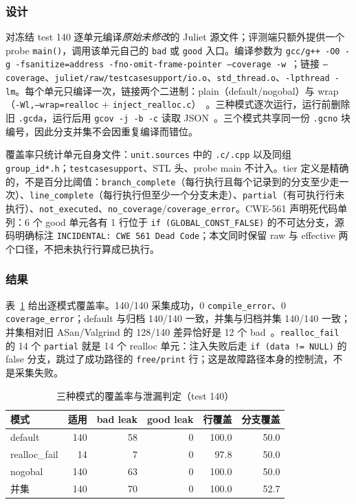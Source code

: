 \documentclass[conference]{IEEEtran}
\begin{document}
\subsubsection{设计}

对冻结 test 140 逐单元编译\emph{原始未修改}的 Juliet 源文件；评测端只额外提供一个 probe \texttt{main()}，调用该单元自己的 \texttt{bad} 或 \texttt{good} 入口。编译参数为 \texttt{gcc/g++ -O0 -g -fsanitize=address -fno-omit-frame-pointer --coverage -w}~\cite{serebryany2012asan}；链接 \texttt{--coverage}、\texttt{juliet/raw/testcasesupport/io.o}、\texttt{std\_thread.o}、\texttt{-lpthread -lm}。每个单元只编译一次，链接两个二进制：plain（default/nogobal）与 wrap（\texttt{-Wl,--wrap=realloc} + \texttt{inject\_realloc.c}）~\cite{cppreference_realloc}。三种模式逐次运行，运行前删除旧 \texttt{.gcda}，运行后用 \texttt{gcov -j -b -c} 读取 JSON~\cite{gcov}。三个模式共享同一份 \texttt{.gcno} 块编号，因此分支并集不会因重复编译而错位。

覆盖率只统计单元自身文件：\texttt{unit.sources} 中的 \texttt{.c/.cpp} 以及同组 \texttt{group\_id*.h}；\texttt{testcasesupport}、STL 头、probe main 不计入。tier 定义是精确的，不是百分比阈值：\texttt{branch\_complete}（每行执行且每个记录到的分支至少走一次）、\texttt{line\_complete}（每行执行但至少一个分支未走）、\texttt{partial}（有可执行行未执行）、\texttt{not\_executed}、\texttt{no\_coverage}/\texttt{coverage\_error}。CWE-561 声明死代码单列：6 个 good 单元各有 1 行位于 \texttt{if (GLOBAL\_CONST\_FALSE)} 的不可达分支，源码明确标注 \texttt{INCIDENTAL: CWE 561 Dead Code}；本文同时保留 raw 与 effective 两个口径，不把未执行行算成已执行。

\subsubsection{结果}

表~\ref{tab:covmode} 给出逐模式覆盖率。140/140 采集成功，0 \texttt{compile\_error}、0 \texttt{coverage\_error}；default 与归档 140/140 一致，并集与归档并集 140/140 一致；并集相对旧 ASan/Valgrind 的 128/140 差异恰好是 12 个 bad~\cite{valgrindmanual}。\texttt{realloc\_fail} 的 14 个 \texttt{partial} 就是 14 个 realloc 单元：注入失败后走 \texttt{if (data != NULL)} 的 false 分支，跳过了成功路径的 \texttt{free/print} 行；这是故障路径本身的控制流，不是采集失败。

\begin{table}[t]
\centering
\caption{三种模式的覆盖率与泄漏判定（test 140）}
\label{tab:covmode}
\footnotesize
\setlength{\tabcolsep}{2.8pt}
\begin{tabular}{@{}lrrrrr@{}}
\toprule
模式 & 适用 & bad leak & good leak & 行覆盖 & 分支覆盖 \\
\midrule
default & 140 & 58 & 0 & 100.0 & 50.0 \\
realloc\_fail & 14 & 7 & 0 & 97.8 & 50.0 \\
nogobal & 140 & 63 & 0 & 100.0 & 50.0 \\
并集 & 140 & 70 & 0 & 100.0 & 52.7 \\
\bottomrule
\end{tabular}
\end{table}
\end{document}

